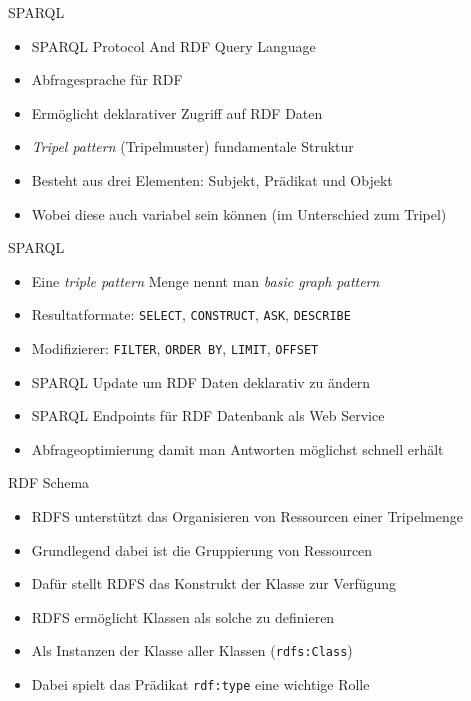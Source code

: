 \documentclass{beamer}
\begin{document}
\begin{frame}{SPARQL}
	
	\begin{itemize}
		\item SPARQL Protocol And RDF Query Language
		\item Abfragesprache für RDF
		\item Ermöglicht deklarativer Zugriff auf RDF Daten
		\item \emph{Tripel pattern} (Tripelmuster) fundamentale Struktur
		\item Besteht aus drei Elementen: Subjekt, Prädikat und Objekt
		\item Wobei diese auch variabel sein können (im Unterschied zum Tripel)
	\end{itemize}
	
\end{frame}

\begin{frame}{SPARQL}
	
	\begin{itemize}
		\item Eine \emph{triple pattern} Menge nennt man \emph{basic graph pattern}
		\item Resultatformate: \texttt{SELECT}, \texttt{CONSTRUCT}, \texttt{ASK}, \texttt{DESCRIBE}
		\item Modifizierer: \texttt{FILTER}, \texttt{ORDER BY}, \texttt{LIMIT}, \texttt{OFFSET}
		\item SPARQL Update um RDF Daten deklarativ zu ändern
		\item SPARQL Endpoints für RDF Datenbank als Web Service
		\item Abfrageoptimierung damit man Antworten möglichst schnell erhält
	\end{itemize}
	
\end{frame}

\begin{frame}{RDF Schema}
	
	\begin{itemize}
		\item RDFS unterstützt das Organisieren von Ressourcen einer Tripelmenge
		\item Grundlegend dabei ist die Gruppierung von Ressourcen
		\item Dafür stellt RDFS das Konstrukt der Klasse zur Verfügung
		\item RDFS ermöglicht Klassen als solche zu definieren
		\item Als Instanzen der Klasse aller Klassen (\texttt{rdfs:Class})
		\item Dabei spielt das Prädikat \texttt{rdf:type} eine wichtige Rolle
	\end{itemize}
	
\end{frame}
\end{document}
